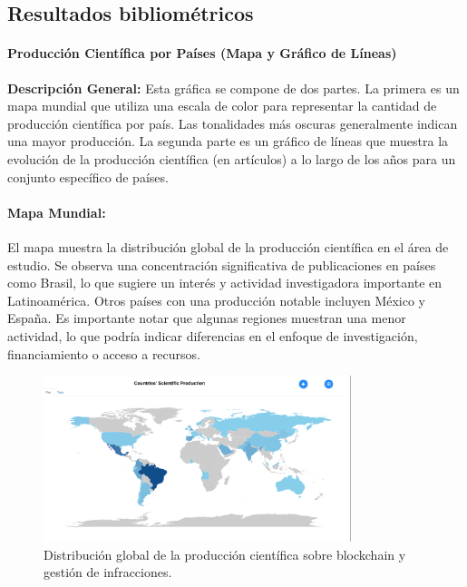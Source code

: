  \subsection{Resultados bibliométricos}
 \paragraph{Producción Científica por Países (Mapa y Gráfico de Líneas) }
 
 \textbf{Descripción General:} Esta gráfica se compone de dos partes. La primera es un mapa mundial que utiliza una escala de color para representar la cantidad de producción científica por país. Las tonalidades más oscuras generalmente indican una mayor producción. La segunda parte es un gráfico de líneas que muestra la evolución de la producción científica (en artículos) a lo largo de los años para un conjunto específico de países. 
\paragraph{Mapa Mundial:}
El mapa muestra la distribución global de la producción científica en el área de estudio. Se observa una concentración significativa de publicaciones en países como Brasil, lo que sugiere un interés y actividad investigadora importante en Latinoamérica. Otros países con una producción notable incluyen México y España. Es importante notar que algunas regiones muestran una menor actividad, lo que podría indicar diferencias en el enfoque de investigación, financiamiento o acceso a recursos. 

\begin{figure}[htbp]
    \centering
    \includegraphics[width=0.8\textwidth]{Images/MapaBibliometrix.png}
    \caption{Distribución global de la producción científica sobre blockchain y gestión de infracciones.}
    \label{fig:mapa_bibliometrix}
\end{figure}

